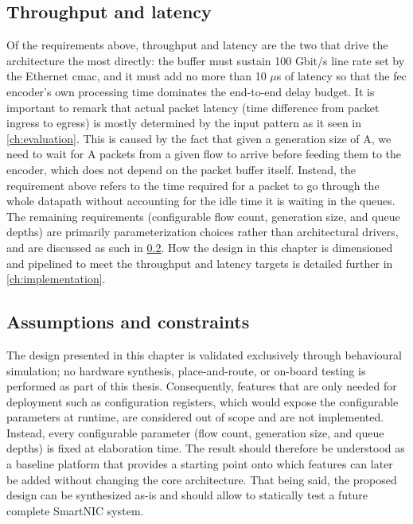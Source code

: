 \subsection{Throughput and latency}
Of the requirements above, throughput and latency are the two that drive the architecture the
most directly: the buffer must sustain 100 Gbit/s line rate set by the Ethernet
\gls{cmac}, and it must add no more than 10 $\mu$s of latency so
that the \gls{fec} encoder's own processing time dominates the end-to-end delay budget. It is important 
to remark that actual packet latency (time difference from packet ingress to egress) is mostly determined 
by the input pattern as it seen in \ref{ch:evaluation}. This is caused by the fact that given a generation 
size of A, we need to wait for A packets from a given flow to arrive before feeding them to the encoder, 
which does not depend on the packet buffer itself. Instead, the requirement above refers to the time 
required for a packet to go through the whole datapath without accounting for the idle time it is 
waiting in the queues. \\

The remaining requirements (configurable flow count, generation 
size, and queue depths) are primarily parameterization choices rather than architectural 
drivers, and are discussed as such in \cref{subsec:assumptions}. How the design in this 
chapter is dimensioned and pipelined to meet the throughput and latency targets is detailed 
further in \cref{ch:implementation}.

\subsection{Assumptions and constraints}\label{subsec:assumptions}
The design presented in this chapter is validated exclusively through behavioural simulation; no
hardware synthesis, place-and-route, or on-board testing is performed as part of this
thesis. Consequently, features that are only needed for deployment such as configuration registers, which 
would expose the configurable parameters at runtime, are considered out of scope and are
not implemented. \\

Instead, every configurable parameter (flow count, generation size, and
queue depths) is fixed at elaboration time. The result should therefore be understood as a
baseline platform that provides a starting point onto which features can later be added 
without changing the core architecture. That being said, the proposed design can 
be synthesized as-is and should allow to statically test a future complete SmartNIC system. \\

